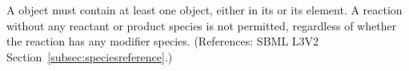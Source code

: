A \Reaction object must contain at least one \SpeciesReference object,
either in its  or its 
element.  A reaction without any reactant or product species is not
permitted, regardless of whether the reaction has any modifier species.
(References: SBML L3V2 Section~\ref{subsec:speciesreference}.)
